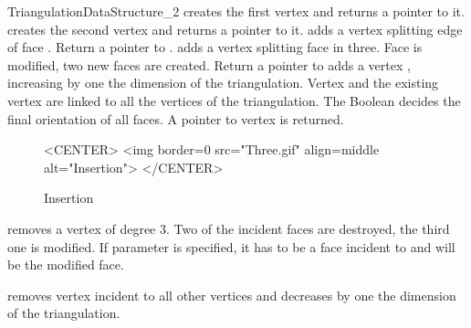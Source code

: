\begin{ccRefConcept}{TriangulationDataStructure_2}
 {creates the first 
vertex and returns a pointer to it.}
\ccGlue
{} {creates the second 
vertex and returns a pointer to it.}
 {adds a
vertex  splitting 
edge  of face . Return a  pointer to .}
\ccGlue
{} {adds a vertex
 splitting  face
 in three. Face  is modified,
two new faces are created. Return a  pointer to  }
\ccGlue
{} 
{adds
a vertex , increasing by one the dimension of the triangulation.
Vertex  and the existing vertex  are linked to all 
the vertices of the triangulation. 
The Boolean  decides the final orientation of all 
faces. A pointer to vertex  is returned.
}

\begin{figure}
\begin{ccTexOnly}
\begin{center}  \end{center}
\caption{Insertion}
\end{ccTexOnly} 

\begin{ccHtmlOnly}
<CENTER>
<img border=0 src="Three.gif" align=middle alt="Insertion">
</CENTER>
\end{ccHtmlOnly} 
\end{figure}


{removes a vertex of degree 3. Two of the incident faces are destroyed,
the third one is modified.
If parameter   is specified, it has to be a face incident to 
and will be the modified face.
}



\ccGlue
{}
\ccGlue
{}
{removes vertex  incident to all other vertices
and  decreases by one the dimension of the triangulation.
 }


\end{ccRefConcept}
